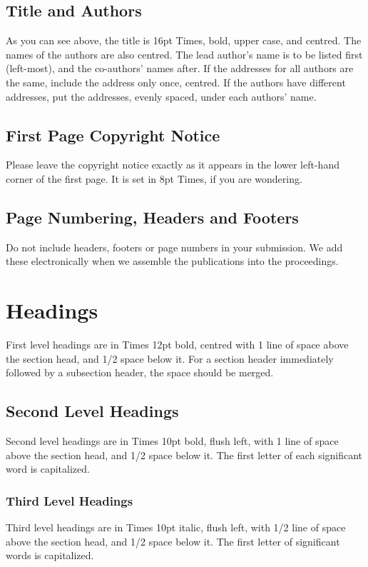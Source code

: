\documentclass{article}
\begin{document}
\subsection{Title and Authors}
As you can see above, the title is 16pt Times, bold, upper case, and centred.
The names of the authors are also centred.
The lead author's name is to be listed first (left-most), and the co-authors'
names after. If the addresses for all authors are the same, include the
address only once, centred. If the authors have different addresses, put the
addresses, evenly spaced, under each authors' name.

\subsection{First Page Copyright Notice}
Please leave the copyright notice exactly as it appears in the lower
left-hand corner of the first page. It is set in 8pt Times, if you are wondering.

\subsection{Page Numbering, Headers and Footers}
Do not include headers, footers or page numbers in your submission.
We add these electronically when we assemble the publications
into the proceedings.

\section{Headings}
First level headings are in Times 12pt bold,
centred with 1 line of space above the section head, and 1/2 space below it.
For a section header immediately followed by a subsection header, the space
should be merged.

\subsection{Second Level Headings}
Second level headings are in Times 10pt bold, flush left,
with 1 line of space above the section head, and 1/2 space below it.
The first letter of each significant word is capitalized.

\subsubsection{Third Level Headings}
Third level headings are in Times 10pt italic, flush left,
with 1/2 line of space above the section head, and 1/2 space below it.
The first letter of significant words is capitalized.
\end{document}

